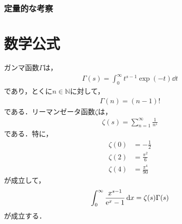 \documentclass{report}
\begin{document}
      \subsection{定量的な考察}
  \appendix
  \chapter{数学公式}
    ガンマ函数$\Gamma$は，
    \begin{align}
      \Gamma(s) = \int_{0}^{\infty}t^{s - 1}\exp(-t)\dd{t}
    \end{align}
    であり，とくに$n\in \mathbb{N}$に対して，
    \begin{align}
      \Gamma(n) = (n - 1)!
    \end{align}
    である．リーマンゼータ函数$\zeta$は，
    \begin{align}
      \zeta(s) = \sum_{n = 1}^{\infty}\frac{1}{n^s}
    \end{align}
    である．特に，
    \begin{align}
      \zeta(0) &= -\frac{1}{2} \\ 
      \zeta(2) &= \frac{\pi^2}{6} \\ 
      \zeta(4) &= \frac{\pi^4}{90}
    \end{align}
    が成立して，
    \begin{align}
      \int_{0}^{\infty} \frac{x^{s - 1}}{\mathrm{e}^x - 1} \dd{x} = \zeta(s)\Gamma(s) 
    \end{align}
    が成立する．
\end{document}

